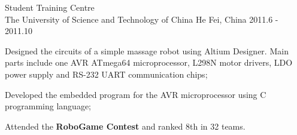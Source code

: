 \begin{cventries}
      {Student Training Centre \\ The University of Science and Technology of China}%
      {He Fei, China}%
      {2011.6 - 2011.10}%
      {
        \begin{cvitems}
          \item Designed the circuits of a simple massage robot using Altium Designer. Main parts include one AVR ATmega64 microprocessor, L298N motor drivers, LDO power supply and RS-232 UART communication chips;
          \item Developed the embedded program for the AVR microprocessor using C programming language;
          \item Attended the \textbf{RoboGame Contest} and ranked 8th in 32 teams.
        \end{cvitems}
      }
\end{cventries}

